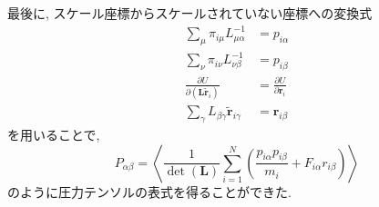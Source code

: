 最後に, スケール座標からスケールされていない座標への変換式
\begin{align}
  \sum_{\mu} \pi_{i\mu} L_{\mu\alpha}^{-1} &= p_{i\alpha} \\
  \sum_{\nu} \pi_{i\nu} L_{\nu\beta}^{-1} &= p_{i\beta} \\
  \frac{\partial U}{\partial (\bm{L}\tilde{\bm{r}}_{i})} &= \frac{\partial U}{\partial \bm{r}_{i}} \\
  \sum_{\gamma} L_{\beta\gamma} \tilde{\bm{r}}_{i\gamma} &= \bm{r}_{i\beta}
\end{align}
を用いることで, 
\begin{equation}
  P_{\alpha\beta} =
  \left\langle
    \frac{1}{\det(\bm{L})} \sum_{i=1}^{N}
    \left(\frac{p_{i\alpha} p_{i\beta}}{m_{i}} + F_{i\alpha}r_{i\beta}\right)
  \right\rangle
\end{equation}
のように圧力テンソルの表式を得ることができた. 



